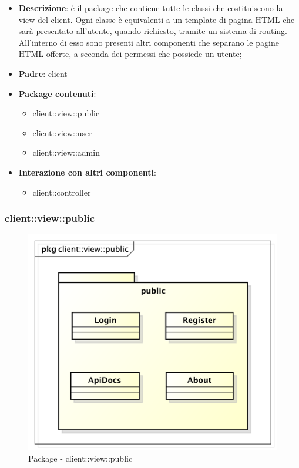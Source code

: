 \begin{itemize}
	\item \textbf{Descrizione}: è il package che contiene tutte le classi che costituiscono la view del client. Ogni classe è equivalenti a un template di pagina HTML che sarà presentato all'utente, quando richiesto, tramite un sistema di routing. \newline
	All'interno di esso sono presenti altri componenti che separano le pagine HTML offerte, a seconda dei permessi che possiede un utente;
	\item \textbf{Padre}: client
	\item \textbf{Package contenuti}:
		\begin{itemize}
			\item client::view::public
			\item client::view::user
			\item client::view::admin
		\end{itemize}
	\item \textbf{Interazione con altri componenti}:
		\begin{itemize}
			\item client::controller
		\end{itemize}
\end{itemize}

\pagebreak

\subsubsection{client::view::public} %
\label{ssub:bdsm_app_client_view_public}
\begin{figure}[htbp]
	\centering
	\centerline{\includegraphics[scale=0.6]{./images/client/client_view_public.pdf}}
	\caption{Package - client::view::public}
\end{figure}

